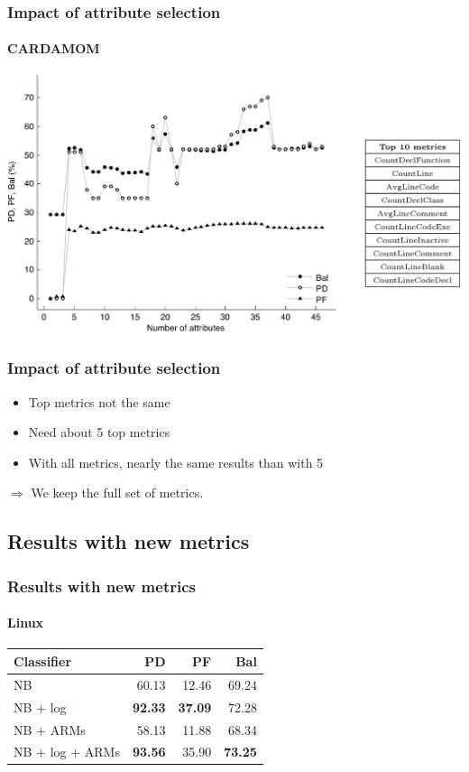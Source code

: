 \documentclass{beamer}
\begin{document}
\begin{frame}
 \frametitle{Impact of attribute selection}
 \framesubtitle{CARDAMOM}
 \begin{center}
  \includegraphics[width=\textwidth]{figures/attributesCardamom.png}
 \end{center}
\end{frame}

\begin{frame}
 \frametitle{Impact of attribute selection}
 \begin{itemize}
  \item Top metrics not the same
  \item Need about 5 top metrics
  \item With all metrics, nearly the same results than with 5
 \end{itemize}
 \vspace{0.5cm}
 \begin{center}
  $\Longrightarrow$ \alert{We keep the full set of metrics.}
 \end{center}
\end{frame}

\subsection{Results with new metrics}
\begin{frame}
 \frametitle{Results with new metrics}
 \framesubtitle{Linux}
 \begin{center}
 \begin{tabular}{lrrr}
  \hspace{0.2cm} Classifier & PD & PF & Bal\\
  \hline
  NB & 60.13 & 12.46 & 69.24\\
  NB + log &  \textbf{92.33} & \textbf{37.09} & 72.28\\
  NB + ARMs & 58.13 & 11.88 & 68.34\\
  NB + log + ARMs & \textbf{93.56} & 35.90 & \textbf{73.25}\\
  \hline
 \end{tabular}
 \end{center}
\end{frame}
\end{document}
